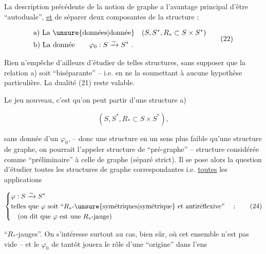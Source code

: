 
La description précédente de la notion de graphe a
l'avantage principal d'être ``autoduale'', \uline{et} de
séparer deux composantes de la structure :

\[
 \begin{aligned}
 &\text{a) La }\unsure{\text{données}|\text{donnée}}\quad(S,S^*,R_*\subset S\times S^*)\\
 &\text{b) La donnée}\qquad \varphi_0:S\xrightarrow{\sim}S^*\ .
 \end{aligned}\tag*{(22)}
\]

Rien n'empêche d'ailleurs d'étudier de telles
structures, sans supposer que la relation a)
soit ``biséparante'' -- i.e. en ne la soumettant
à aucune hypothèse particulière. La dualité
(21) reste valable.

Le jeu nouveau, c'est qu'on peut partir d'une structure a)

\[
 (S,S^*,R_*\subset S\times S^*), \tag*{(23)}
\]

sans donnée d'un $\varphi_0$, -- donc une structure
en un sens plus faible qu'une structure de
graphe, on pourrait l'appeler structure de
``pré-graphe'' -- structure considérée comme ``préliminaire''
à celle de graphe (séparé strict). Il se pose alors
la question d'étudier toutes les structures
de graphe correspondantes i.e. \uline{toutes} les
applications  

\[
 \left\{\begin{aligned}
 &\varphi:S\xrightarrow{\sim}S^*\\
 &\text{telles que }\varphi\text{ soit ``}R_*\text{-\unsure{symétriques|symétrique} et antiréflexive''}\\
 &\quad\text{(on dit que }\varphi\text{ est une }R_*\text{-jauge)}
 \end{aligned}\right.\quad ; \tag*{(24)}
\]

 ``$R_*$-jauges''. On s'intéresse surtout au cas,
bien sûr, où cet ensemble n'est pas vide -- et le $\varphi_0$
de tantôt jouera le rôle d'une ``origine'' dans l'ens

